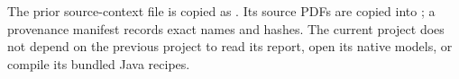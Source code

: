 \documentclass[10pt,a4paper]{article}
\begin{document}
The prior source-context file is copied as . Its source PDFs are copied into ; a provenance manifest records exact names and hashes. The current project does not depend on the previous project to read its report, open its native models, or compile its bundled Java recipes.
\end{document}
